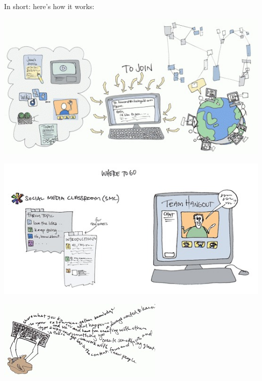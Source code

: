 In short: here's how it works:

\begin{center}
\href{http://peeragogy.org/wp-content/uploads/2012/03/lots\_going\_on\_color\_1000.gif}{\includegraphics[width=.9\textwidth]{../pictures/lots_going_on.jpg}}
\end{center}

\begin{center}
\href{http://peeragogy.org/wp-content/uploads/2012/03/where\_to\_go\_color.gif}{\includegraphics[width=.9\textwidth]{../pictures/where_to_go_color.jpg}}
\end{center}

\begin{center}
\href{http://peeragogy.org/wp-content/uploads/2012/03/create\_content.gif}{\includegraphics[width=.9\textwidth]{../pictures/create_content.jpg}}
\end{center}

